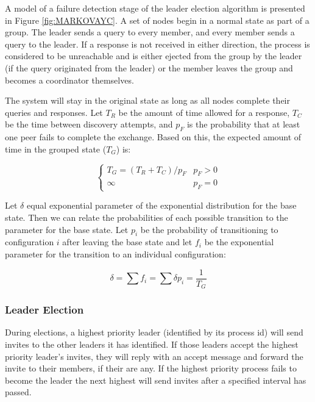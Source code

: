 A model of a failure detection stage of the leader election algorithm is presented in
Figure \ref{fig:MARKOVAYC}. A set of nodes begin in a normal state as part of a group.
The leader sends a query to every member, and every member sends a query to the leader.
If a response is not received in either direction, the process is considered to be
unreachable and is either ejected from the group by the leader (if the query originated from the leader)
or the member leaves the group and becomes a coordinator themselves.

The system will stay in the original state as long as all nodes complete their queries and responses.
Let $T_{R}$ be the amount of time allowed for a response, $T_{C}$ be the time between
discovery attempts, and $p_{F}$ is the probability that at least one peer fails to complete the exchange.
Based on this, the expected amount of time in the grouped state ($T_{G}$) is:

\begin{equation}
\begin{cases}
T_{G} = ( T_{R}+T_{C}  ) / p_{F} & p_{F} > 0 \\
\infty & p_{F} = 0
\end{cases}
\end{equation}

Let $\delta$ equal exponential parameter of the exponential distribution for the base state. Then
we can relate the probabilities of each possible transition to the parameter for the base state. Let
$p_{i}$ be the probability of transitioning to configuration $i$ after leaving the base state and let
$f_{i}$ be the exponential parameter for the transition to an individual configuration:

\begin{equation}
\delta = \sum f_{i} = \sum \delta p_{i} = \frac{1}{T_{G}}
\end{equation}


\subsubsection{Leader Election}
During elections, a highest priority leader (identified by its process id) will
send invites to the other leaders it has identified. If those leaders accept
the highest priority leader's invites, they will reply with an accept message
and forward the invite to their members, if their are any. If the highest
priority process fails to become the leader the next highest will send invites
after a specified interval has passed.

